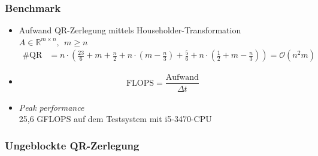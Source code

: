 

\begin{frame}
\frametitle{Benchmark}
	\begin{itemize}
		\item Aufwand QR-Zerlegung mittels Householder-Transformation $A \in \mathbb{R}^{m \times n},~~ m \ge n$
		\begin{align*}
			\#\text{QR} &= n\cdot\left( \frac{23}{6}+m+\frac{n}{2} + n\cdot\left(m-\frac{n}{3}\right) + \frac{5}{6} + n\cdot\left(\frac{1}{2} + m-\frac{n}{3}\right) \right) = \mathcal{O}(n^2m)
		\end{align*}
		\item 
		\begin{align*}
			\text{FLOPS} = \dfrac{\text{Aufwand}}{\Delta t}
		\end{align*}
		\item \textit{Peak performance} \\
		25,6 GFLOPS auf dem Testsystem mit i5-3470-CPU
	\end{itemize}
\end{frame}

\begin{frame}
	\frametitle{Ungeblockte QR-Zerlegung}
	\centering
\end{frame}



